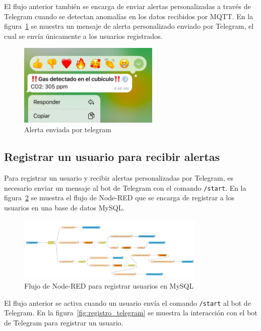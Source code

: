El flujo anterior también se encarga de enviar alertas personalizadas a través de Telegram cuando se detectan anomalías en los datos recibidos por MQTT. En la figura~\ref{fig:telegram} se muestra un mensaje de alerta personalizado enviado por Telegram, el cual se envía únicamente a los usuarios registrados.

\begin{figure}[H]
    \centering
    \includegraphics[width=0.6\textwidth]{img/telegram_alerta.jpg}
    \caption{Alerta enviada por telegram}
    \label{fig:telegram}
\end{figure}

\subsection*{Registrar un usuario para recibir alertas}

Para registrar un usuario y recibir alertas personalizadas por Telegram, es necesario enviar un mensaje al bot de Telegram con el comando \texttt{/start}. En la figura~\ref{fig:registro} se muestra el flujo de Node-RED que se encarga de registrar a los usuarios en una base de datos MySQL.

\begin{figure}[H]
    \centering
    \includegraphics[width=0.8\textwidth]{img/flow_telegram.png}
    \caption{Flujo de Node-RED para registrar usuarios en MySQL}
    \label{fig:registro}
\end{figure}

El flujo anterior se activa cuando un usuario envía el comando \texttt{/start} al bot de Telegram. En la figura~\ref{fig:registro_telegram} se muestra la interacción con el bot de Telegram para registrar un usuario.

